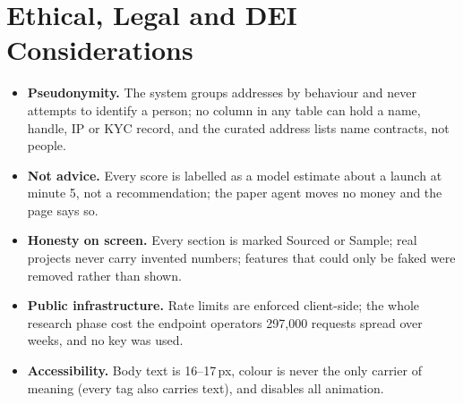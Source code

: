 \section{Ethical, Legal and DEI Considerations}
\begin{itemize}
  \item \textbf{Pseudonymity.} The system groups addresses by behaviour and never attempts to identify a person; no column in any table can hold a name, handle, IP or KYC record, and the curated address lists name contracts, not people.
  \item \textbf{Not advice.} Every score is labelled as a model estimate about a launch at minute 5, not a recommendation; the paper agent moves no money and the page says so.
  \item \textbf{Honesty on screen.} Every section is marked Sourced or Sample; real projects never carry invented numbers; features that could only be faked were removed rather than shown.
  \item \textbf{Public infrastructure.} Rate limits are enforced client-side; the whole research phase cost the endpoint operators 297,000 requests spread over weeks, and no key was used.
  \item \textbf{Accessibility.} Body text is 16--17\,px, colour is never the only carrier of meaning (every tag also carries text), and  disables all animation.
\end{itemize}
